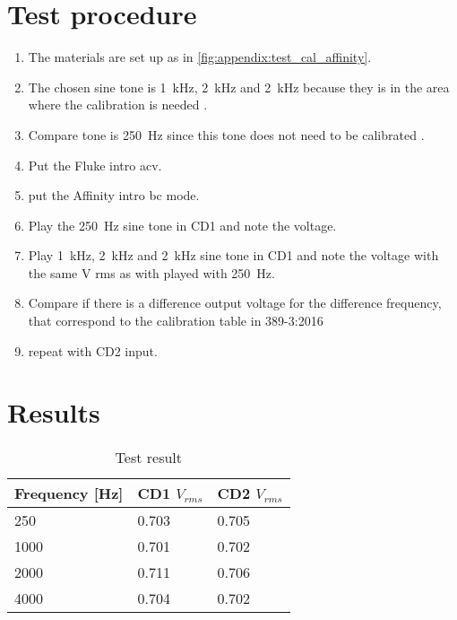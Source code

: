 \section*{Test procedure}


\begin{enumerate}
\item The materials are set up as in \autoref{fig:appendix:test_cal_affinity}.
\item The chosen sine tone is \SI{1}{\kilo\hertz}, \SI{2}{\kilo\hertz} and \SI{2}{\kilo\hertz} because they is in the area where the calibration is needed \citep{radioear_b81}.
\item Compare tone is \SI{250}{\hertz} since this tone does not need to be calibrated \citep{radioear_b81}.
\item Put the Fluke intro \gls{acv}. 
\item put the Affinity intro \gls{bc} mode.
\item  Play the \SI{250}{\hertz} sine tone in CD1 and note the voltage.
\item  Play  \SI{1}{\kilo\hertz}, \SI{2}{\kilo\hertz} and \SI{2}{\kilo\hertz} sine tone in CD1 and note the voltage with the same \si{\volt} \gls{rms} as with played with \SI{250}{\hertz}.
\item Compare if there is a difference output voltage for the difference frequency, that correspond to the calibration table in 389-3:2016 \citep{iso_389-3}
\item repeat with CD2 input.
\end{enumerate}

\section*{Results}

\begin{table}[H]
\caption{Test result}
\begin{tabular}{l|ll}
Frequency [\si{\hertz}] & CD1 $V_{rms}$ & CD2 $V_{rms}$ \\ \hline
250                     & 0.703         & 0.705         \\
1000                    & 0.701         & 0.702         \\
2000                    & 0.711         & 0.706         \\
4000                    & 0.704         & 0.702        
\end{tabular}
\label{tab:append_cal_anal_affinity}
\end{table}

